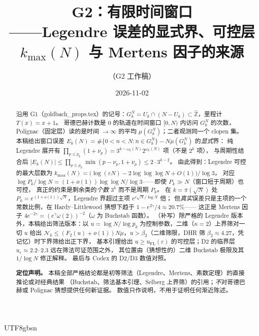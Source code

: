 \documentclass[11pt,a4paper]{article}
\newcommand{\Zhat}{\widehat{\mathbb Z}}
\newcommand{\Haar}{\mu}
\newcommand{\Cnt}{\mathcal N}          %
\newcommand{\kmax}{k_{\max}}
\theoremstyle{plain}
\theoremstyle{definition}
\begin{document}
\begin{CJK}{UTF8}{gbsn}

\title{G2：有限时间窗口\\[2pt]
\large ——{}Legendre 误差的显式界、可控层 $\kmax(N)$ 与 Mertens 因子的来源}
\author{（G2 工作稿）}
\date{2026-11-02}
\maketitle

\begin{abstract}
沿用 G1（goldbach\_props.tex）的记号：$G_k^N=U_k\cap(N-U_k)\subset\Zhat$，里程计 $T(x)=x+1$。
哥德巴赫计数是 $0$ 的轨道在时间窗口 $[0,N)$ 内访问 $G_k^N$ 的次数，Polignac（固定层）读的是时间 $\to\infty$ 的平均
$\Haar(G_k^N)$；二者观测同一个 clopen 集。本稿给出窗口误差
$E_k(N)=\#\{0<n<N:n\in G_k^N\}-N\Haar(G_k^N)$ 的\emph{显式}界：
纯 Legendre 展开有 $\prod_{p\le p_k}(1+\nu_p)=3^{k-\omega_k(N)}2^{\omega_k(N)}$ 项（不是 $2^k$ 项），
与周期性结合后 $|E_k(N)|\le\prod_{p\le p_k}\min(p-\nu_p,1+\nu_p)\le2\cdot3^{k-2}$。
由此得到：Legendre 可控的最大层数为 $\kmax(N)=\bigl(\log(\varepsilon N)-2\log\log\log N+O(1)\bigr)/\log3$，
对应 $\log P_k/\log N=(1+o(1))\log\log N/\log3$——即使 $P_k\gg N$（窗口短于周期）也可控，
真正的约束是剩余类的\emph{个数} $3^k$ 而不是周期 $P_k$。
在 $k=\pi(\sqrt N)$ 处 $P_k=e^{(1+o(1))\sqrt N}$，Legendre 界超过主项 $e^{c\sqrt N/\log N}$ 倍；
但\emph{真实}误差只是主项的一个常数比例，在 Hardy--Littlewood 猜想下趋于 $1-e^{2\gamma}/4\approx20.7\%$——
这正是 Mertens 因子 $4e^{-2\gamma}=(e^\gamma\omega(2))^{-2}$（$\omega$ 为 Buchstab 函数）。
（补写）除严格的 Legendre 版本外，本稿给出筛法版本：以 $u=\log N/\log p_k$ 为控制参数，二维（$\kappa=2$）上界筛对一切 $u$ 给出
$\Cnt_k\le(F_2(u)+o(1))N\Haar$，$u>\beta_2$（二维筛限，DHR 筛 $\beta_2\approx4.27$，凭记忆）时下界筛给出正下界，
基本引理给出 $u\ge u_{\mathrm{FL}}(\varepsilon)$ 的可控层；D2 的临界层 $u_c\approx2.2$--$2.3$ 远在筛法可证范围之外，
其位置由（猜想性的）二维 Buchstab 极限及其 $1/\log N$ 修正解释。
最后与 Codex 的 D2/D3 数值对照。

\textbf{定位声明。} 本稿全部严格结论都是初等筛法（Legendre、Mertens、素数定理）的直接推论或对经典结果
（Buchstab、筛法基本引理、Selberg 上界筛）的引用；\emph{不}对哥德巴赫或 Polignac 猜想提供任何新证据。
数值只作说明，不用于证明任何渐近陈述。
\end{abstract}


\end{CJK}
\end{document}
